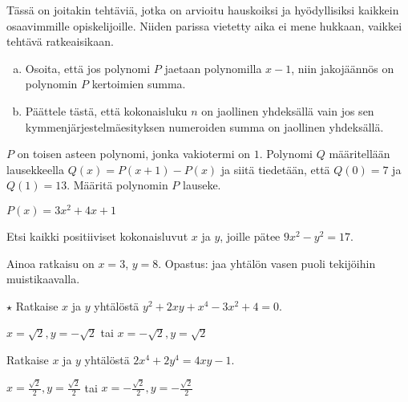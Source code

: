 Tässä on joitakin tehtäviä, jotka on arvioitu hauskoiksi ja hyödyllisiksi kaikkein osaavimmille opiskelijoille. Niiden parissa vietetty aika ei mene hukkaan, vaikkei tehtävä ratkeaisikaan.

\begin{tehtava}
    \begin{enumerate}[a)]
        \item Osoita, että jos polynomi $P$ jaetaan polynomilla $x-1$, niin jakojäännös on polynomin $P$ kertoimien summa.
        \item Päättele tästä, että kokonaisluku $n$ on jaollinen yhdeksällä vain jos sen kymmenjärjestelmäesityksen numeroiden summa on jaollinen yhdeksällä.
    \end{enumerate}
\end{tehtava}

\begin{tehtava} %
    $P$ on toisen asteen polynomi, jonka vakiotermi on $1$. Polynomi $Q$ määritellään lausekkeella $Q(x)=P(x+1)-P(x)$ ja siitä tiedetään, että $Q(0)=7$ ja $Q(1)=13$. Määritä polynomin $P$ lauseke.
    \begin{vastaus}
        $P(x) = 3x^2+4x+1$
    \end{vastaus}
\end{tehtava}

\begin{tehtava} %
    Etsi kaikki positiiviset kokonaisluvut $x$ ja $y$, joille pätee $9x^2-y^2=17$.
    \begin{vastaus}
    Ainoa ratkaisu on $x = 3$, $y=8$. Opastus: jaa yhtälön vasen puoli tekijöihin muistikaavalla. 
    \end{vastaus}
\end{tehtava}

\begin{tehtava}
    $\star$ Ratkaise $x$ ja $y$ yhtälöstä $y^2+2xy+x^4-3x^2+4=0$.
    \begin{vastaus}
        $x=\sqrt{2}, y=-\sqrt{2}$ tai $x=-\sqrt{2}, y=\sqrt{2}$
    \end{vastaus}
\end{tehtava}

\begin{tehtava} %
    Ratkaise $x$ ja $y$ yhtälöstä $2x^4+2y^4=4xy-1$. %
    \begin{vastaus}
        $x=\frac{\sqrt{2}}{2}, y=\frac{\sqrt{2}}{2}$ tai $x=-\frac{\sqrt{2}}{2}, y=-\frac{\sqrt{2}}{2}$
    \end{vastaus}
\end{tehtava}

